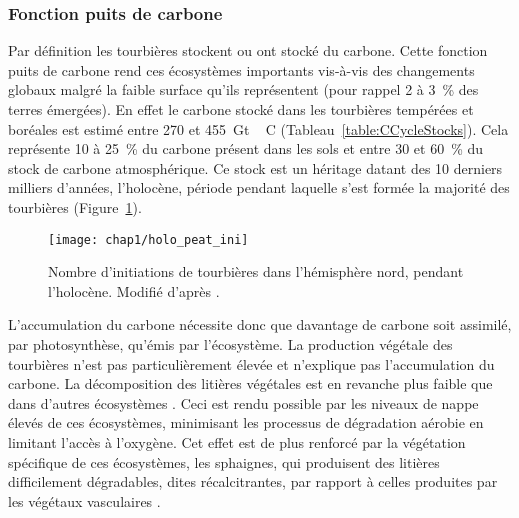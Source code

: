 \subsubsection{Fonction puits de carbone}
Par définition les tourbières stockent ou ont stocké du carbone.
Cette fonction puits de carbone rend ces écosystèmes importants vis-à-vis des changements globaux malgré la faible surface qu'ils représentent (pour rappel 2 à \SI{3}{\percent} des terres émergées).
En effet le carbone stocké dans les tourbières tempérées et boréales est estimé entre 270 et \SI{455}{\giga\tonne\,C} (Tableau~\ref{table:CCycleStocks}).
Cela représente 10 à \SI{25}{\percent} du carbone présent dans les sols et entre 30 et \SI{60}{\percent} du stock de carbone atmosphérique.
Ce stock est un héritage datant des 10 derniers milliers d'années, l'holocène, période pendant laquelle s'est formée la majorité des tourbières \citep{yu2010,macdonald2006} (Figure~\ref{fig:holo_peat_ini}).

\begin{figure}
\centering
\texttt{[image: chap1/holo\_peat\_ini]}
\caption{Nombre d'initiations de tourbières dans l'hémisphère nord, pendant l'holocène. Modifié d'après \citep{macdonald2006}.}
\label{fig:holo_peat_ini}
\end{figure}

L'accumulation du carbone nécessite donc que davantage de carbone soit assimilé, par photosynthèse, qu'émis par l'écosystème.
La production végétale des tourbières n'est pas particulièrement élevée \citep{huc1980} et n'explique pas l'accumulation du carbone.
La décomposition des litières végétales est en revanche plus faible que dans d'autres écosystèmes \citep{rydin2013a}.
Ceci est rendu possible par les niveaux de nappe élevés de ces écosystèmes, minimisant les processus de dégradation aérobie en limitant l'accès à l'oxygène.
Cet effet est de plus renforcé par la végétation spécifique de ces écosystèmes, les sphaignes, qui produisent des litières difficilement dégradables, dites récalcitrantes, par rapport à celles produites par les végétaux vasculaires \citep{hobbie1996,liu2000,bragazza2007}.

